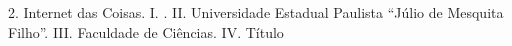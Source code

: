 \documentclass[
	12pt,				%
	openright,			%
	oneside,			%
	a4paper,			%
	chapter=TITLE,		%
	english,			%
	french,				%
	spanish,			%
	brazil				%
	]{abntex2}
\begin{document}
{\begin{fichacatalografica}
\begin{center}
{\begin{minipage}[c][8cm]{13.5cm}
	\hspace{0.5cm}
		2. Internet das Coisas.
		I. \imprimirorientador.
		II. Universidade Estadual Paulista ``Júlio de Mesquita Filho''.
		III. Faculdade de Ciências.
		IV. Título
	\end{minipage}}
	\end{center}
  \end{fichacatalografica}
\fi







%
% 
%
\begin{folhadeaprovacao}
  \ABNTEXchapterfont {

	 \begin{center}

		{\ImprimirAutor}

		\vspace*{\fill}\vspace*{\fill}

		\begin{center}
		  \bfseries\large\ImprimirTitulo
		\end{center}


\end{center}}
\end{folhadeaprovacao}}
\end{document}
